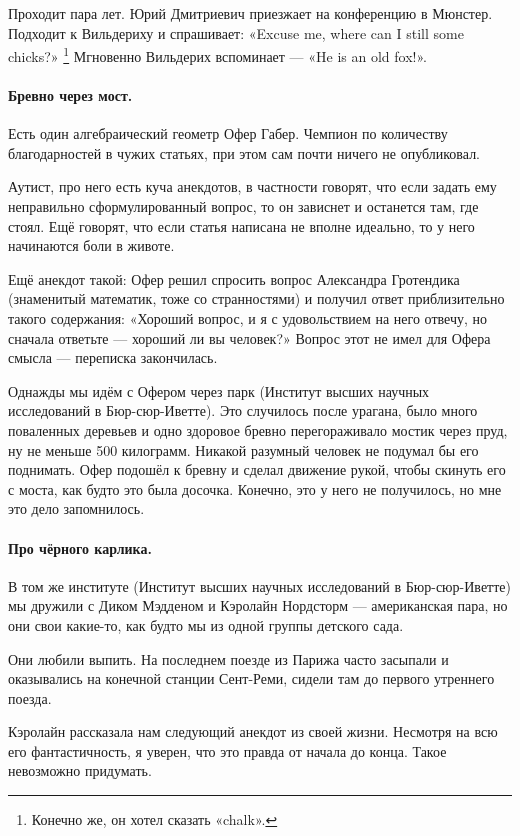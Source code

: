 \documentclass{book}
\begin{document}
Проходит пара лет.
Юрий Дмитриевич приезжает на конференцию в Мюнстер.
Подходит к Вильдериху и спрашивает: «Excuse me, where can I still some chicks?»%
\footnote{Конечно же, он хотел сказать «chalk».}
Мгновенно Вильдерих вспоминает --- «He is an old fox!».

\paragraph{Бревно через мост.}
Есть один алгебраический геометр Офер Габер.
Чемпион по количеству благодарностей в чужих статьях, при этом сам почти ничего не опубликовал.

Аутист, про него есть куча анекдотов, в частности говорят, что если задать ему неправильно сформулированный вопрос, то он зависнет и останется там, где стоял.
Ещё говорят, что если статья написана не вполне идеально, то у него начинаются боли в животе.

Ещё анекдот такой: Офер решил спросить вопрос Александра Гротендика (знаменитый математик, тоже со странностями) и получил ответ приблизительно такого содержания: «Хороший вопрос, и я с удовольствием на него отвечу, но сначала ответьте --- хороший ли вы человек?»
Вопрос этот не имел для Офера смысла --- переписка закончилась.

Однажды мы идём с Офером через парк (Институт высших научных исследований в Бюр-сюр-Иветте).
Это случилось после урагана, было много поваленных деревьев и одно здоровое бревно перегораживало мостик через пруд,
ну не меньше 500 килограмм.
Никакой разумный человек не подумал бы его поднимать.
Офер подошёл к бревну и сделал движение рукой, чтобы скинуть его с моста, как будто это была досочка.
Конечно, это у него не получилось, но мне это дело запомнилось.

\paragraph{Про чёрного карлика.}
В том же институте (Институт высших научных исследований в Бюр-сюр-Иветте) мы дружили с  
Диком Мэдденом и Кэролайн Нордсторм --- американская пара, но они свои какие-то, как будто мы из одной группы детского сада.

Они любили выпить.
На последнем поезде из Парижа часто засыпали и оказывались на конечной станции Сент-Реми, сидели там до первого утреннего поезда.

{\sloppy

Кэролайн рассказала нам следующий анекдот из своей жизни.
Несмотря на всю его фантастичность, я уверен, что это правда от начала до конца.
Такое невозможно придумать.

}
\end{document}
